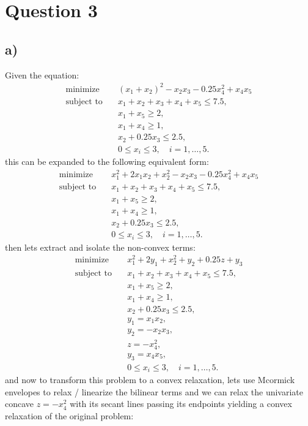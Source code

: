 \documentclass{article} %
\begin{document}
\section*{Question 3}
    \subsection*{a)}
    Given the equation:
    \begin{align*}
    \text{minimize} \quad & (x_1 + x_2)^2 - x_2x_3 - 0.25x_4^2 + x_4x_5 \\
    \text{subject to} \quad & x_1 + x_2 + x_3 + x_4 + x_5 \leq 7.5, \\
    & x_1 + x_5 \geq 2, \\
    & x_1 + x_4 \geq 1, \\
    & x_2 + 0.25x_3 \leq 2.5, \\
    & 0 \leq x_i \leq 3, \quad i = 1, \ldots, 5.
    \end{align*}
    this can be expanded to the following equivalent form:
    \begin{align*}
    \text{minimize} \quad & x_1^2 + 2x_1x_2 + x_2^2 - x_2x_3 - 0.25x_4^2 + x_4x_5 \\
    \text{subject to} \quad & x_1 + x_2 + x_3 + x_4 + x_5 \leq 7.5, \\
    & x_1 + x_5 \geq 2, \\
    & x_1 + x_4 \geq 1, \\
    & x_2 + 0.25x_3 \leq 2.5, \\
    & 0 \leq x_i \leq 3, \quad i = 1, \ldots, 5.
    \end{align*}
    then lets extract and isolate the non-convex terms:
    \begin{align*}
    \text{minimize} \quad & x_1^2 + 2y_1 + x_2^2 + y_2 + 0.25z + y_3 \\
    \text{subject to} \quad & x_1 + x_2 + x_3 + x_4 + x_5 \leq 7.5, \\
    & x_1 + x_5 \geq 2, \\
    & x_1 + x_4 \geq 1, \\
    & x_2 + 0.25x_3 \leq 2.5, \\
    & y_1 = x_1x_2, \\
    & y_2 = -x_2x_3, \\
    & z = -x_4^2, \\
    & y_3 = x_4x_5, \\
    & 0 \leq x_i \leq 3, \quad i = 1, \ldots, 5.
    \end{align*}
    and now to transform this problem to a convex relaxation, lets use Mcormick envelopes to relax / linearize the bilinear terms and we can relax the univariate concave $z=-x_4^2$ with its secant lines passing its endpoints yielding a convex relaxation of the original problem:
\end{document}

